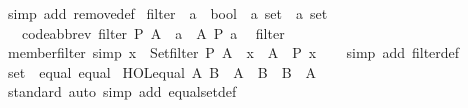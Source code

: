 \begin{isabellebody}
%
\isatagproof
{}\isamarkupfalse%
\ {\isacharparenleft}{\kern0pt}simp\ add{\isacharcolon}{\kern0pt}\ remove{\isacharunderscore}{\kern0pt}def{\isacharparenright}{\kern0pt}%
\endisatagproof
{\isafoldproof}%
%
\isadelimproof
\isanewline
%
\endisadelimproof
\isanewline
{}\isamarkupfalse%
\ filter\ {\isacharcolon}{\kern0pt}{\isacharcolon}{\kern0pt}\ {\isachardoublequoteopen}{\isacharparenleft}{\kern0pt}{\isacharprime}{\kern0pt}a\ {\isasymRightarrow}\ bool{\isacharparenright}{\kern0pt}\ {\isasymRightarrow}\ {\isacharprime}{\kern0pt}a\ set\ {\isasymRightarrow}\ {\isacharprime}{\kern0pt}a\ set{\isachardoublequoteclose}\isanewline
\ \ \ {\isacharbrackleft}{\kern0pt}code{\isacharunderscore}{\kern0pt}abbrev{\isacharbrackright}{\kern0pt}{\isacharcolon}{\kern0pt}\ {\isachardoublequoteopen}filter\ P\ A\ {\isacharequal}{\kern0pt}\ {\isacharbraceleft}{\kern0pt}a\ {\isasymin}\ A{\isachardot}{\kern0pt}\ P\ a{\isacharbraceright}{\kern0pt}{\isachardoublequoteclose}\isanewline
\isanewline
{}\isamarkupfalse%
\ {\isacharparenleft}{\kern0pt}\ filter\isanewline
\isanewline
{}\isamarkupfalse%
\ member{\isacharunderscore}{\kern0pt}filter\ {\isacharbrackleft}{\kern0pt}simp{\isacharbrackright}{\kern0pt}{\isacharcolon}{\kern0pt}\ {\isachardoublequoteopen}x\ {\isasymin}\ Set{\isachardot}{\kern0pt}filter\ P\ A\ {\isasymlongleftrightarrow}\ x\ {\isasymin}\ A\ {\isasymand}\ P\ x{\isachardoublequoteclose}\isanewline
%
\isadelimproof
\ \ %
\endisadelimproof
%
\isatagproof
{}\isamarkupfalse%
\ {\isacharparenleft}{\kern0pt}simp\ add{\isacharcolon}{\kern0pt}\ filter{\isacharunderscore}{\kern0pt}def{\isacharparenright}{\kern0pt}%
\endisatagproof
{\isafoldproof}%
%
\isadelimproof
\isanewline
%
\endisadelimproof
\isanewline
{}\isamarkupfalse%
\ set\ {\isacharcolon}{\kern0pt}{\isacharcolon}{\kern0pt}\ {\isacharparenleft}{\kern0pt}equal{\isacharparenright}{\kern0pt}\ equal\isanewline
{}\isanewline
\isanewline
{}\isamarkupfalse%
\ {\isachardoublequoteopen}HOL{\isachardot}{\kern0pt}equal\ A\ B\ {\isasymlongleftrightarrow}\ A\ {\isasymsubseteq}\ B\ {\isasymand}\ B\ {\isasymsubseteq}\ A{\isachardoublequoteclose}\isanewline
\isanewline
{}\isamarkupfalse%
%
\isadelimproof
\ %
\endisadelimproof
%
\isatagproof
{}\isamarkupfalse%
\ standard\ {\isacharparenleft}{\kern0pt}auto\ simp\ add{\isacharcolon}{\kern0pt}\ equal{\isacharunderscore}{\kern0pt}set{\isacharunderscore}{\kern0pt}def{\isacharparenright}{\kern0pt}%

\end{isabellebody}
